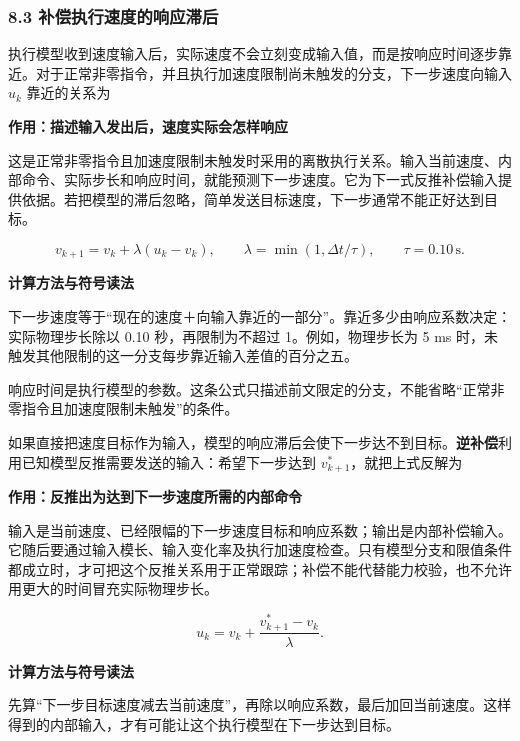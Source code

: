 \documentclass[12pt,a4paper]{article}
\numberwithin{equation}{topic}
\begin{document}
\subsubsection*{8.3 补偿执行速度的响应滞后}

执行模型收到速度输入后，实际速度不会立刻变成输入值，而是按响应时间逐步靠近。对于正常非零指令，并且执行加速度限制尚未触发的分支，下一步速度向输入 \(u_k\) 靠近的关系为

\noindent\textbf{作用：描述输入发出后，速度实际会怎样响应}\par\nobreak
这是正常非零指令且加速度限制未触发时采用的离散执行关系。输入当前速度、内部命令、实际步长和响应时间，就能预测下一步速度。它为下一式反推补偿输入提供依据。若把模型的滞后忽略，简单发送目标速度，下一步通常不能正好达到目标。

\begin{equation}
\label{eq:actuator}
v_{k+1}=v_k+\lambda(u_k-v_k),\qquad
\lambda=\min(1,\Delta t/\tau),\qquad \tau=0.10\,\mathrm s.
\end{equation}

\noindent\textbf{计算方法与符号读法}\par\nobreak
下一步速度等于“现在的速度＋向输入靠近的一部分”。靠近多少由响应系数决定：实际物理步长除以 0.10 秒，再限制为不超过 1。例如，物理步长为 5 ms 时，未触发其他限制的这一分支每步靠近输入差值的百分之五。

响应时间是执行模型的参数。这条公式只描述前文限定的分支，不能省略“正常非零指令且加速度限制未触发”的条件。


如果直接把速度目标作为输入，模型的响应滞后会使下一步达不到目标。\textbf{逆补偿}利用已知模型反推需要发送的输入：希望下一步达到 \(v^*_{k+1}\)，就把上式反解为

\noindent\textbf{作用：反推出为达到下一步速度所需的内部命令}\par\nobreak
输入是当前速度、已经限幅的下一步速度目标和响应系数；输出是内部补偿输入。它随后要通过输入模长、输入变化率及执行加速度检查。只有模型分支和限值条件都成立时，才可把这个反推关系用于正常跟踪；补偿不能代替能力校验，也不允许用更大的时间冒充实际物理步长。

\begin{equation}
\label{eq:compensation}
u_k=v_k+\frac{v^*_{k+1}-v_k}{\lambda}.
\end{equation}

\noindent\textbf{计算方法与符号读法}\par\nobreak
先算“下一步目标速度减去当前速度”，再除以响应系数，最后加回当前速度。这样得到的内部输入，才有可能让这个执行模型在下一步达到目标。
\end{document}

